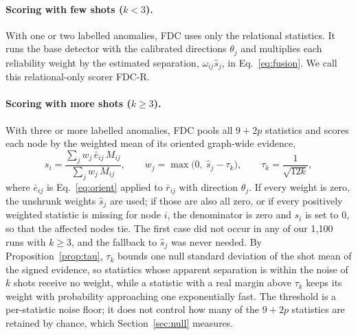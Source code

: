 \documentclass[pdflatex,sn-mathphys-ay]{sn-jnl}
\theoremstyle{plain}
\theoremstyle{remark}
\begin{document}
\paragraph{Scoring with few shots ($k<3$).} With one or two labelled anomalies, FDC uses only the relational statistics. It runs the base detector with the calibrated directions $\theta_j$ and multiplies each reliability weight by the estimated separation, $\omega_{ij}\hat s_j$, in Eq.~\eqref{eq:fusion}. We call this relational-only scorer FDC-R.

\paragraph{Scoring with more shots ($k\ge3$).} With three or more labelled anomalies, FDC pools all $9+2p$ statistics and scores each node by the weighted mean of its oriented graph-wide evidence,
\begin{equation}\label{eq:fdc}
s_i=\frac{\sum_j w_j\,\bar e_{ij}\,M_{ij}}{\sum_j w_j\,M_{ij}},\qquad w_j=\max\big(0,\ \hat s_j-\tau_k\big),\qquad \tau_k=\frac{1}{\sqrt{12k}},
\end{equation}
where $\bar e_{ij}$ is Eq.~\eqref{eq:orient} applied to $\bar r_{ij}$ with direction $\theta_j$. If every weight is zero, the unshrunk weights $\hat s_j$ are used; if those are also all zero, or if every positively weighted statistic is missing for node $i$, the denominator is zero and $s_i$ is set to 0, so that the affected nodes tie. The first case did not occur in any of our 1{,}100 runs with $k\ge3$, and the fallback to $\hat s_j$ was never needed. By Proposition~\ref{prop:tau}, $\tau_k$ bounds one null standard deviation of the shot mean of the signed evidence, so statistics whose apparent separation is within the noise of $k$ shots receive no weight, while a statistic with a real margin above $\tau_k$ keeps its weight with probability approaching one exponentially fast. The threshold is a per-statistic noise floor; it does not control how many of the $9+2p$ statistics are retained by chance, which Section~\ref{sec:null} measures.
\end{document}
